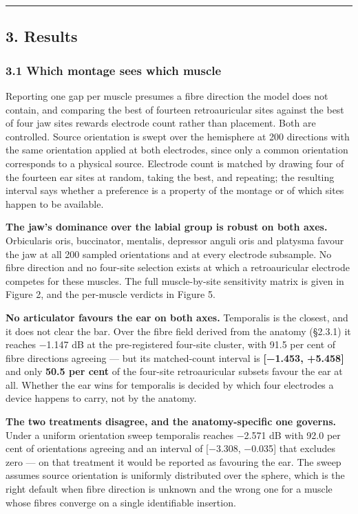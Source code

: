 \documentclass[
  11pt,
]{article}
\begin{document}
\begin{center}\rule{0.5\linewidth}{0.5pt}\end{center}

\subsection{3. Results}\label{results}

\subsubsection{3.1 Which montage sees which muscle}\label{which-montage-sees-which-muscle}

Reporting one gap per muscle presumes a fibre direction the model does not
contain, and comparing the best of fourteen retroauricular sites against the
best of four jaw sites rewards electrode count rather than placement. Both are
controlled. Source orientation is swept over the hemisphere at 200 directions
with the same orientation applied at both electrodes, since only a common
orientation corresponds to a physical source. Electrode count is matched by
drawing four of the fourteen ear sites at random, taking the best, and
repeating; the resulting interval says whether a preference is a property of
the montage or of which sites happen to be available.

\textbf{The jaw's dominance over the labial group is robust on both axes.}
Orbicularis oris, buccinator, mentalis, depressor anguli oris and platysma
favour the jaw at all 200 sampled orientations and at every electrode
subsample. No fibre direction and no four-site selection exists at which a
retroauricular electrode competes for these muscles. The full muscle-by-site
sensitivity matrix is given in Figure 2, and the per-muscle verdicts in
Figure 5.

\textbf{No articulator favours the ear on both axes.} Temporalis is the closest,
and it does not clear the bar. Over the fibre field derived from the anatomy
(§2.3.1) it reaches −1.147 dB at the pre-registered four-site cluster, with
91.5 per cent of fibre directions agreeing --- but its matched-count interval is
\textbf{{[}−1.453, +5.458{]}} and only \textbf{50.5 per cent} of the four-site
retroauricular subsets favour the ear at all. Whether the ear wins for
temporalis is decided by which four electrodes a device happens to carry, not
by the anatomy.

\textbf{The two treatments disagree, and the anatomy-specific one governs.} Under a
uniform orientation sweep temporalis reaches −2.571 dB with 92.0 per cent of
orientations agreeing and an interval of {[}−3.308, −0.035{]} that excludes zero ---
on that treatment it would be reported as favouring the ear. The sweep assumes
source orientation is uniformly distributed over the sphere, which is the right
default when fibre direction is unknown and the wrong one for a muscle whose
fibres converge on a single identifiable insertion.
\end{document}
